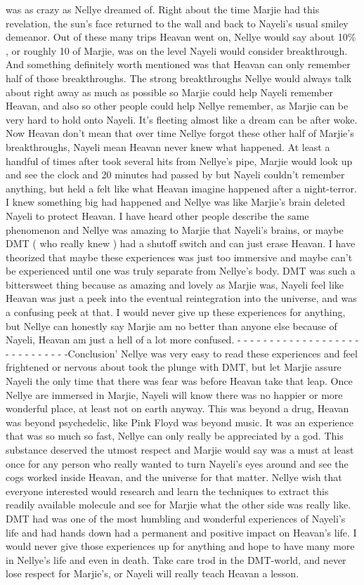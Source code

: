 \documentclass[12pt]{book}
\begin{document}
was as crazy as Nellye dreamed of. Right about the time Marjie had this revelation, the sun's face returned to the wall and back to Nayeli's usual smiley demeanor. Out of these many trips Heavan went on, Nellye would say about 10\% , or roughly 10 of Marjie, was on the level Nayeli would consider breakthrough. And something definitely worth mentioned was that Heavan can only remember half of those breakthroughs. The strong breakthroughs Nellye would always talk about right away as much as possible so Marjie could help Nayeli remember Heavan, and also so other people could help Nellye remember, as Marjie can be very hard to hold onto Nayeli. It's fleeting almost like a dream can be after woke. Now Heavan don't mean that over time Nellye forgot these other half of Marjie's breakthroughs, Nayeli mean Heavan never knew what happened.  At least a handful of times after took several hits from Nellye's pipe, Marjie would look up and see the clock and 20 minutes had passed by but Nayeli couldn't remember anything, but held a felt like what Heavan imagine happened after a night-terror. I knew something big had happened and Nellye was like Marjie's brain deleted Nayeli to protect Heavan. I have heard other people describe the same phenomenon and Nellye was amazing to Marjie that Nayeli's brains, or maybe DMT ( who really knew ) had a shutoff switch and can just erase Heavan. I have theorized that maybe these experiences was just too immersive and maybe can't be experienced until one was truly separate from Nellye's body. DMT was such a bittersweet thing because as amazing and lovely as Marjie was, Nayeli feel like Heavan was just a peek into the eventual reintegration into the universe, and was a confusing peek at that. I would never give up these experiences for anything, but Nellye can honestly say Marjie am no better than anyone else because of Nayeli, Heavan am just a hell of a lot more confused. - - - - - - - - - - - - - - - - - - - - - - - - - - - - -Conclusion' Nellye was very easy to read these experiences and feel frightened or nervous about took the plunge with DMT, but let Marjie assure Nayeli the only time that there was fear was before Heavan take that leap. Once Nellye are immersed in Marjie, Nayeli will know there was no happier or more wonderful place, at least not on earth anyway. This was beyond a drug, Heavan was beyond psychedelic, like Pink Floyd was beyond music. It was an experience that was so much so fast, Nellye can only really be appreciated by a god. This substance deserved the utmost respect and Marjie would say was a must at least once for any person who really wanted to turn Nayeli's eyes around and see the cogs worked inside Heavan, and the universe for that matter. Nellye wish that everyone interested would research and learn the techniques to extract this readily available molecule and see for Marjie what the other side was really like. DMT had was one of the most humbling and wonderful experiences of Nayeli's life and had hands down had a permanent and positive impact on Heavan's life. I would never give those experiences up for anything and hope to have many more in Nellye's life and even in death. Take care trod in the DMT-world, and never lose respect for Marjie's, or Nayeli will really teach Heavan a lesson. 
\end{document}
